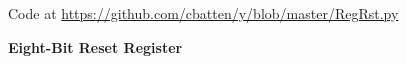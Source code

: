 
\begin{figure}

  

  \centerline{\small Code at
    \url{https://github.com/cbatten/y/blob/master/RegRst.py}}

  \caption{\textbf{Eight-Bit Reset Register}}
  \label{code-tut3-regincr-reg}

\end{figure}


